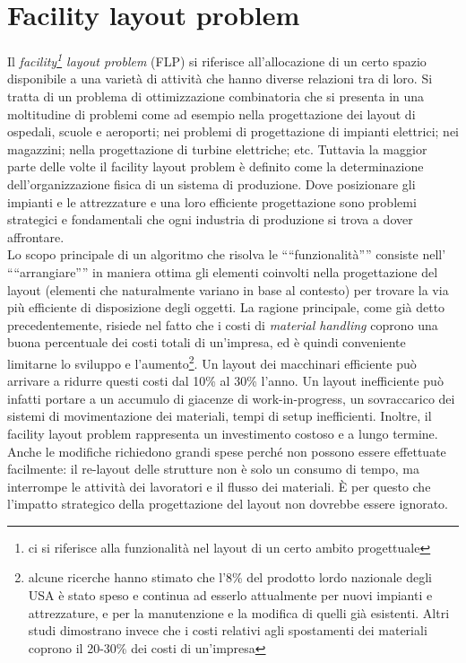 \documentclass[12pt,a4paper,openright,twoside]{report}
\begin{document}
\section{Facility layout problem}
Il \textit{facility\footnote{ci si riferisce alla funzionalit\`{a} nel layout di un certo ambito progettuale} layout problem} (FLP) si riferisce all'allocazione di un certo spazio disponibile a una variet\`{a} di attivit\`{a} che hanno diverse relazioni tra di loro. Si tratta di un problema di ottimizzazione combinatoria che si presenta in una moltitudine di problemi come ad esempio nella progettazione dei layout di ospedali, scuole e aeroporti; nei problemi di progettazione di impianti elettrici; nei magazzini; nella progettazione di turbine elettriche; etc. Tuttavia la maggior parte delle volte il facility layout problem \`{e} definito come la determinazione dell'organizzazione fisica di un sistema di produzione. Dove posizionare gli impianti e le attrezzature e una loro efficiente progettazione sono problemi strategici e fondamentali che ogni industria di produzione si trova a dover affrontare.\\
Lo scopo principale di un algoritmo che risolva le "`"`funzionalit\`{a}"'"' consiste nell' "`"`arrangiare"'"' in maniera ottima gli elementi coinvolti nella progettazione del layout (elementi che naturalmente variano in base al contesto) per trovare la via pi\`{u} efficiente di disposizione degli oggetti. La ragione principale, come gi\`{a} detto precedentemente, risiede nel fatto che i costi di \textit{material handling} coprono una buona percentuale dei costi totali di un'impresa, ed \`{e} quindi conveniente limitarne lo sviluppo e l'aumento\footnote{alcune ricerche hanno stimato che l'8\% del prodotto lordo nazionale degli USA \`{e} stato speso e continua ad esserlo attualmente per nuovi impianti e attrezzature, e per la manutenzione e la modifica di quelli gi\`{a} esistenti. Altri studi dimostrano invece che i costi relativi agli spostamenti dei materiali coprono il 20-30\% dei costi di un'impresa}.
Un layout dei macchinari efficiente pu\`{o} arrivare a ridurre questi costi dal 10\% al 30\% l'anno. Un layout inefficiente pu\`{o} infatti portare a un accumulo di giacenze di work-in-progress, un sovraccarico dei sistemi di movimentazione dei materiali, tempi di setup inefficienti. Inoltre, il facility layout problem rappresenta un investimento costoso e a lungo termine. Anche le modifiche richiedono grandi spese perch\'{e} non possono essere effettuate facilmente: il re-layout delle strutture non \`{e} solo un consumo di tempo, ma interrompe le attivit\`{a} dei lavoratori e il flusso dei materiali. \`{E} per questo che l'impatto strategico della progettazione del layout non dovrebbe essere ignorato.\\
\end{document}
